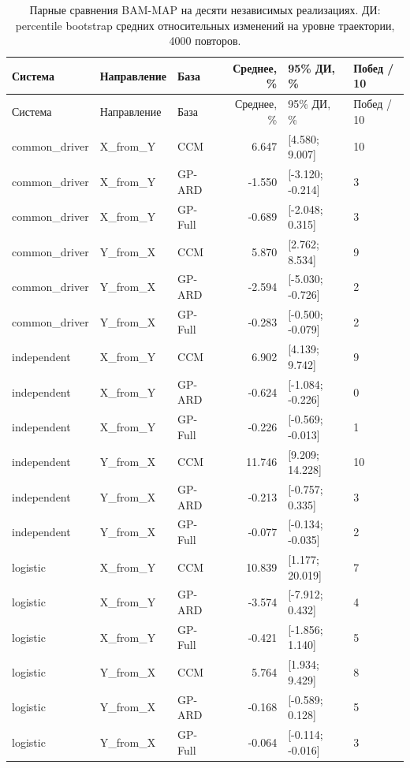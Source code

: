 \begin{longtable}{lllrll}
\caption{Парные сравнения BAM-MAP на десяти независимых реализациях. ДИ: percentile bootstrap средних относительных изменений на уровне траектории, 4000 повторов.}\label{tab:paired}\\
\toprule
Система & Направление & База & Среднее, \% & 95\% ДИ, \% & Побед / 10 \\
\midrule
\endfirsthead
\toprule
Система & Направление & База & Среднее, \% & 95\% ДИ, \% & Побед / 10 \\
\midrule
\endhead
common\_driver & X\_from\_Y & CCM & 6.647 & [4.580; 9.007] & 10 \\
common\_driver & X\_from\_Y & GP-ARD & -1.550 & [-3.120; -0.214] & 3 \\
common\_driver & X\_from\_Y & GP-Full & -0.689 & [-2.048; 0.315] & 3 \\
common\_driver & Y\_from\_X & CCM & 5.870 & [2.762; 8.534] & 9 \\
common\_driver & Y\_from\_X & GP-ARD & -2.594 & [-5.030; -0.726] & 2 \\
common\_driver & Y\_from\_X & GP-Full & -0.283 & [-0.500; -0.079] & 2 \\
independent & X\_from\_Y & CCM & 6.902 & [4.139; 9.742] & 9 \\
independent & X\_from\_Y & GP-ARD & -0.624 & [-1.084; -0.226] & 0 \\
independent & X\_from\_Y & GP-Full & -0.226 & [-0.569; -0.013] & 1 \\
independent & Y\_from\_X & CCM & 11.746 & [9.209; 14.228] & 10 \\
independent & Y\_from\_X & GP-ARD & -0.213 & [-0.757; 0.335] & 3 \\
independent & Y\_from\_X & GP-Full & -0.077 & [-0.134; -0.035] & 2 \\
logistic & X\_from\_Y & CCM & 10.839 & [1.177; 20.019] & 7 \\
logistic & X\_from\_Y & GP-ARD & -3.574 & [-7.912; 0.432] & 4 \\
logistic & X\_from\_Y & GP-Full & -0.421 & [-1.856; 1.140] & 5 \\
logistic & Y\_from\_X & CCM & 5.764 & [1.934; 9.429] & 8 \\
logistic & Y\_from\_X & GP-ARD & -0.168 & [-0.589; 0.128] & 5 \\
logistic & Y\_from\_X & GP-Full & -0.064 & [-0.114; -0.016] & 3 \\
\bottomrule
\end{longtable}

